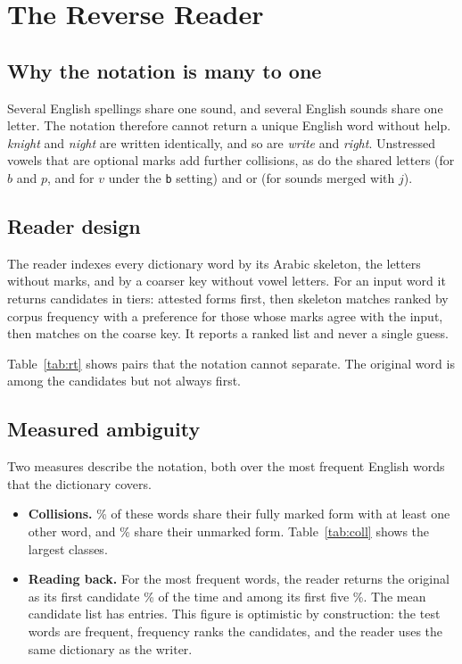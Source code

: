 \chapter{The Reverse Reader}\label{ch:reader}

\section{Why the notation is many to one}
Several English spellings share one sound, and several English sounds share one letter. The notation therefore cannot return a unique English word without help. \emph{knight} and \emph{night} are written identically, and so are \emph{write} and \emph{right}. Unstressed vowels that are optional marks add further collisions, as do the shared letters  (for $b$ and $p$, and for $v$ under the \texttt{b} setting) and  or  (for sounds merged with $j$).

\section{Reader design}
The reader indexes every dictionary word by its Arabic skeleton, the letters without marks, and by a coarser key without vowel letters. For an input word it returns candidates in tiers: attested forms first, then skeleton matches ranked by corpus frequency with a preference for those whose marks agree with the input, then matches on the coarse key. It reports a ranked list and never a single guess.

Table~\ref{tab:rt} shows pairs that the notation cannot separate. The original word is among the candidates but not always first.

\begin{table}[ht]\centering\small

\caption{Words whose spelling is shared with another English word.}\label{tab:rt}
\end{table}

\section{Measured ambiguity}
Two measures describe the notation, both over the \NFreq{} most frequent English words that the dictionary covers.

\begin{itemize}
\item \textbf{Collisions.} \PctSharedFull{}\% of these words share their fully marked form with at least one other word, and \PctSharedSkel{}\% share their unmarked form. Table~\ref{tab:coll} shows the largest classes.
\item \textbf{Reading back.} For the \RtWords{} most frequent words, the reader returns the original as its first candidate \RtTopOne{}\% of the time and among its first five \RtTopFive{}\%. The mean candidate list has \RtMeanCand{} entries. This figure is optimistic by construction: the test words are frequent, frequency ranks the candidates, and the reader uses the same dictionary as the writer.
\end{itemize}

